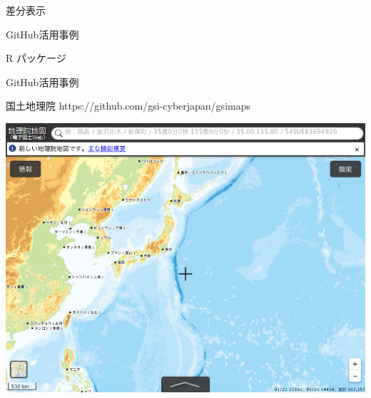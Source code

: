 \documentclass[ignorenonframetext,]{beamer}
\begin{document}
\begin{frame}{差分表示}


\end{frame}

\begin{frame}


\end{frame}

\begin{frame}{\faGithub GitHub活用事例}

R パッケージ

\end{frame}

\begin{frame}{\faGithub GitHub活用事例}

国土地理院 \tiny{https://github.com/gsi-cyberjapan/gsimaps}

\includegraphics[scale = 0.4]{images/map.png}

\end{frame}
\end{document}
